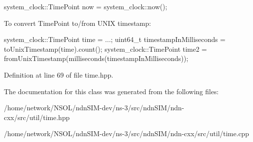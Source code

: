 {\ttfamily  system\+\_\+clock\+::\+Time\+Point now = system\+\_\+clock\+::now(); }

To convert Time\+Point to/from U\+N\+IX timestamp\+:

{\ttfamily  system\+\_\+clock\+::\+Time\+Point time = ...; uint64\+\_\+t timestamp\+In\+Milliseconds = to\+Unix\+Timestamp(time).count(); system\+\_\+clock\+::\+Time\+Point time2 = from\+Unix\+Timestamp(milliseconds(timestamp\+In\+Milliseconds)); } 

Definition at line 69 of file time.\+hpp.



The documentation for this class was generated from the following files\+:\begin{DoxyCompactItemize}
\item 
/home/network/\+N\+S\+O\+L/ndn\+S\+I\+M-\/dev/ns-\/3/src/ndn\+S\+I\+M/ndn-\/cxx/src/util/time.\+hpp\item 
/home/network/\+N\+S\+O\+L/ndn\+S\+I\+M-\/dev/ns-\/3/src/ndn\+S\+I\+M/ndn-\/cxx/src/util/time.\+cpp\end{DoxyCompactItemize}
